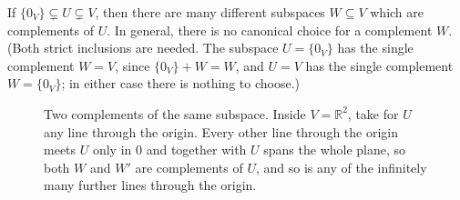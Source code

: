 \begin{importantremark}
\label{rem:complement_not_unique}
If $\{0_V\} \subsetneq U \subsetneq V$, then there are many different subspaces $W \subseteq V$ which are complements of $U$. In general, there is no canonical choice for a complement $W$. (Both strict inclusions are needed. The subspace $U = \{0_V\}$ has the single complement $W = V$, since $\{0_V\} + W = W$, and $U = V$ has the single complement $W = \{0_V\}$; in either case there is nothing to choose.)
\end{importantremark}

\begin{figure}[htbp]
  \centering
  \caption{Two complements of the same subspace. Inside $V = \mathbb{R}^{2}$,
  take for $U$ any line through the origin. Every other line through the origin
  meets $U$ only in $0$ and together with $U$ spans the whole plane, so both $W$
  and $W'$ are complements of $U$, and so is any of the infinitely many
  further lines through the origin.}
  \label{fig:complements_not_unique}
\end{figure}

